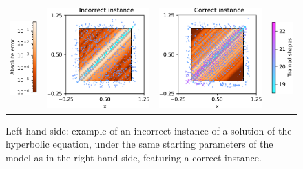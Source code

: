 \documentclass[12pt]{report} %
\begin{document}
\clearpage
\begin{figure}
  \hspace*{-2cm}
  \begin{tabular}{cccc}
    \includegraphics[width=.09\textwidth]{imagenes/experiments/2d/hyperbolic_1d/abs_err_comp.pdf} &
    \includegraphics[width=.45\textwidth]{imagenes/experiments/2d/hyperbolic_1d/bad_900_60_2_cropped.pdf}&
    \includegraphics[width=.45\textwidth]{imagenes/experiments/2d/hyperbolic_1d/good_900_60_6_cropped.pdf}&
    \includegraphics[width=.08\textwidth]{imagenes/experiments/2d/hyperbolic_1d/tr_shap_comp.pdf}  
  \end{tabular}
  \caption{Left-hand side: example of an incorrect instance of a solution of the hyperbolic equation, under the same starting parameters of the model as in the right-hand side, featuring a correct instance.}
  \label{fig:example-of-experiment-for-1d-wave-equation}
\end{figure}
\end{document}
